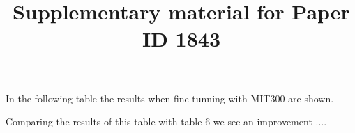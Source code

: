 \documentclass[10pt,onecolumn,letterpaper]{article}
\begin{document}

\title{ Supplementary material for Paper ID 1843}
\maketitle




In the following table the results when fine-tunning with MIT300 are shown.

Comparing the results of this table with table 6 we see an improvement ....

\end{document}
